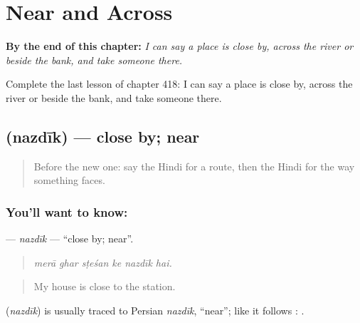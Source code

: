 
\chapter{Near and Across}
\label{ch:hi-near-and-across}

\begin{chapteropening}
\textbf{By the end of this chapter:} \emph{I can say a place is close by, across the river or beside the bank, and take someone there.}

Complete the last lesson of chapter 418: I can say a place is close by, across the river or beside the bank, and take someone there.
\end{chapteropening}

\section[\texorpdfstring{\hi{नज़दीक} (nazdīk)}{नज़दीक (nazdīk)}]{ (nazdīk) — close by; near}

\label{lesson:HI-C418-nazdik}



\begin{quote}
Before the new one: say the Hindi for a route, then the Hindi for the way something faces.
\end{quote}

\subsection*{You'll want to know: }
\textbf{} — \emph{nazdīk} — \textquotedblleft{}close by; near\textquotedblright{}.

\begin{quote}
     
\end{quote}

\begin{quote}
\emph{merā ghar sṭeśan ke nazdīk hai.}
\end{quote}

\begin{quote}
My house is close to the station.
\end{quote}

\begin{cousinweb}
\textbf{} (\emph{nazdīk}) is usually traced to Persian \emph{nazdīk}, \textquotedblleft{}near\textquotedblright{}; like  it follows :   .
\end{cousinweb}

